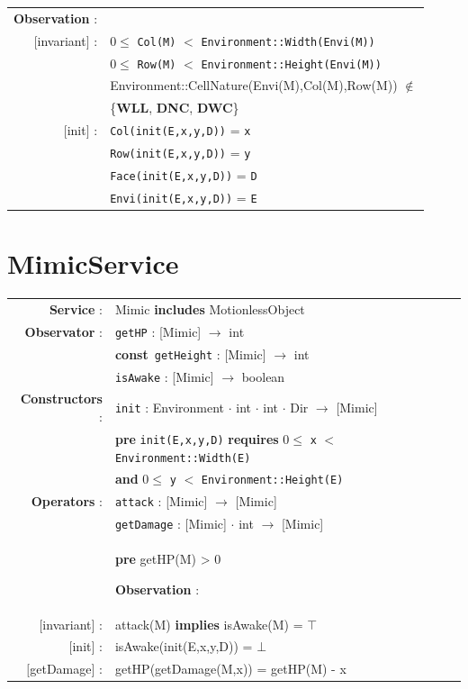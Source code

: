 \documentclass[12pt]{report}
\begin{document}
\begin{tabular}{rl}

\textbf{Observation} : \\
$[$invariant$]$ : & $0 \leq$ \texttt{Col(M)} $<$ \texttt{Environment::Width(Envi(M))} \\
& $0 \leq$ \texttt{Row(M)} $<$ \texttt{Environment::Height(Envi(M))} \\
& Environment::CellNature(Envi(M),Col(M),Row(M)) $\notin$ \\
& \{\textbf{WLL}, \textbf{DNC},  \textbf{DWC}\} \\
$[$init$]$ : & \texttt{Col(init(E,x,y,D))} = \texttt{x} \\
& \texttt{Row(init(E,x,y,D))} = \texttt{y} \\
& \texttt{Face(init(E,x,y,D))} = \texttt{D} \\
& \texttt{Envi(init(E,x,y,D))} = \texttt{E} \\

\end{tabular}

\section{MimicService}

\begin{tabular}{rl}

\textbf{Service} : & Mimic \textbf{includes} MotionlessObject \\

\textbf{Observator} : & \texttt{getHP} : \textrm{[Mimic]} $\rightarrow$ \textrm{int} \\
& \textbf{const}~\texttt{getHeight} : \textrm{[Mimic]} $\rightarrow$ \textrm{int} \\
& \texttt{isAwake} : \textrm{[Mimic]} $\rightarrow$ \textrm{boolean} \\

\textbf{Constructors} : & \texttt{init} : \textrm{Environment} $\cdot$ \textrm{int} $\cdot$ \textrm{int} $\cdot$ \textrm{Dir} $\rightarrow$ \textrm{[Mimic]} \\
& \textbf{pre} \texttt{init(E,x,y,D)} \textbf{requires} $0 \leq$ \texttt{x} $<$ \texttt{Environment::Width(E)} \\
& \quad\quad\quad\quad \textbf{and} $0 \leq$ \texttt{y} $<$ \texttt{Environment::Height(E)} \\

\textbf{Operators} : & \texttt{attack} : \textrm{[Mimic]} $\rightarrow$ \textrm{[Mimic]} \\
& \texttt{getDamage} : \textrm{[Mimic]} $\cdot$ \textrm{int} $\rightarrow$ \textrm{[Mimic]} \\
& \quad\quad \textbf{pre} getHP(M) > 0

\textbf{Observation} : \\
$[$invariant$]$ : & attack(M) \textbf{implies} isAwake(M) = $\top$ \\
$[$init$]$ : & isAwake(init(E,x,y,D)) = $\bot$ \\
$[$getDamage$]$ : & getHP(getDamage(M,x)) = getHP(M) - x \\

\end{tabular}
\end{document}
